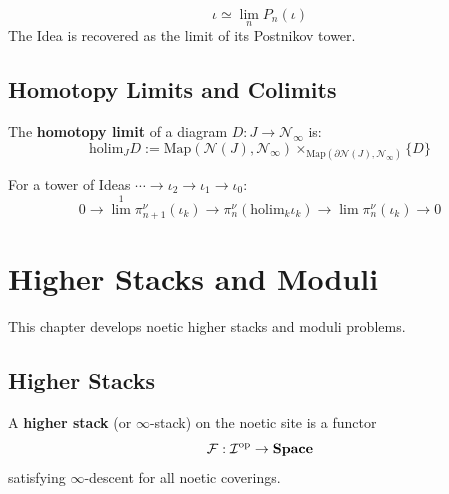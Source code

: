 \begin{theorem}
\label{thm:postnikov-conv}
\[
\iota \simeq \lim_n P_n(\iota)
\]
The Idea is recovered as the limit of its Postnikov tower.
\end{theorem}

\section{Homotopy Limits and Colimits}

\begin{definition}
\label{def:homotopy-limit}
The \textbf{homotopy limit} of a diagram $D : J \to \mathcal{N}_\infty$ is:
\[
\mathrm{holim}_J D := \mathrm{Map}(\mathcal{N}(J), \mathcal{N}_\infty) \times_{\mathrm{Map}(\partial\mathcal{N}(J), \mathcal{N}_\infty)} \{D\}
\]
\end{definition}

\begin{theorem}
\label{thm:milnor}
For a tower of Ideas $\cdots \to \iota_2 \to \iota_1 \to \iota_0$:
\[
0 \to \lim^1 \pi^\nu_{n+1}(\iota_k) \to \pi^\nu_n(\mathrm{holim}_k \iota_k) \to \lim \pi^\nu_n(\iota_k) \to 0
\]
\end{theorem}


\chapter{Higher Stacks and Moduli}
\label{ch:higher-stacks}

\begin{tcolorbox}[colback=blue!5!white,colframe=blue!75!black,title=\vnewfour]
This chapter develops noetic higher stacks and moduli problems.
\end{tcolorbox}

\section{Higher Stacks}

\begin{definition}
\label{def:higher-stack}
A \textbf{higher stack} (or $\infty$-stack) on the noetic site is a functor
\[
\mathcal{F} : \mathcal{I}^{\mathrm{op}} \to \mathbf{Space}
\]
satisfying $\infty$-descent for all noetic coverings.
\end{definition}

